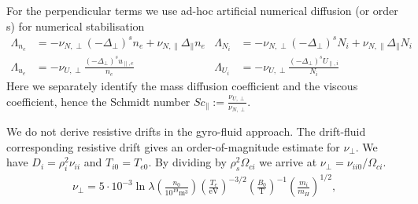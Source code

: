  For the perpendicular terms we use ad-hoc artificial numerical diffusion (or
 order s) for numerical stabilisation %
\begin{align}
\label{eq:perpdiffNU}
\Lambda_{n_e} &=  -\nu_{N,\perp}(-\Delta_\perp)^s n_e + \nu_{N,\parallel}\Delta_\parallel n_e&
\Lambda_{N_i} &=  -\nu_{N,\perp}(-\Delta_\perp)^s N_i + \nu_{N,\parallel}\Delta_\parallel N_i& \\
\Lambda_{u_e} &=  -\nu_{U,\perp}\frac{(-\Delta_\perp)^s u_{\parallel,e}}{n_e} &
\Lambda_{U_i} &=  -\nu_{U,\perp}\frac{(-\Delta_\perp)^s U_{\parallel,i}}{N_i}
\end{align}
Here we separately identify the mass diffusion coefficient and the viscous
coefficient, hence the Schmidt number \(\mathit{Sc}_\parallel:=
\frac{\nu_{U,\perp}}{\nu_{N,\perp}}\).

We do not derive resistive drifts in the gyro-fluid approach.
The drift-fluid corresponding resistive drift gives an order-of-magnitude estimate for $\nu_\perp$.
We have  $D_i = \rho_i^2 \nu_{ii}$ and $T_{i0} = T_{e0}$.
By dividing by $\rho_s^2 \Omega_{ci}$ we arrive at $\nu_\perp = \nu_{ii0}/\Omega_{ci}$.
\begin{align}
\nu_\perp =
5\cdot 10^{-3} \ln \lambda
\left(\frac{n_0}{10^{19}\text{m}^3}\right)
\left(\frac{T_e}{\text{eV}}\right)^{-3/2}
\left(\frac{B_0}{\text{T}}\right)^{-1}
\left(\frac{m_i}{m_H}\right)^{1/2},
\end{align}


